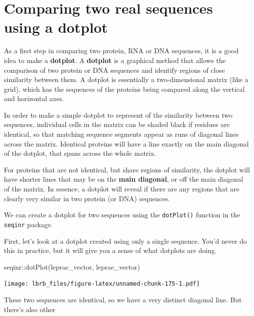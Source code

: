 \documentclass[
]{book}
\newenvironment{Shaded}{\begin{snugshade}}{\end{snugshade}}
\newcommand{\FunctionTok}[1]{\textcolor[rgb]{0.00,0.00,0.00}{#1}}
\newcommand{\NormalTok}[1]{#1}
\newcommand{\SpecialCharTok}[1]{\textcolor[rgb]{0.00,0.00,0.00}{#1}}
\begin{document}
\hypertarget{comparing-two-real-sequences-using-a-dotplot}{%
\section{Comparing two real sequences using a dotplot}\label{comparing-two-real-sequences-using-a-dotplot}}

As a first step in comparing two protein, RNA or DNA sequences, it is a good idea to make a \textbf{dotplot}. A \textbf{dotplot} is a graphical method that allows the comparison of two protein or DNA sequences and identify regions of close similarity between them. A dotplot is essentially a two-dimensional matrix (like a grid), which has the sequences of the proteins being compared along the vertical and horizontal axes.

In order to make a simple dotplot to represent of the similarity between two sequences, individual cells in the matrix can be shaded black if residues are identical, so that matching sequence segments appear as runs of diagonal lines across the matrix. Identical proteins will have a line exactly on the main diagonal of the dotplot, that spans across the whole matrix.

For proteins that are not identical, but share regions of similarity, the dotplot will have shorter lines that may be on the \textbf{main diagonal}, or off the main diagonal of the matrix. In essence, a dotplot will reveal if there are any regions that are clearly very similar in two protein (or DNA) sequences.

We can create a dotplot for two sequences using the \texttt{dotPlot()} function in the \texttt{seqinr} package.

First, let's look at a dotplot created using only a single sequence. You'd never do this in practice, but it will give you a sense of what dotplots are doing.

\begin{Shaded}
\begin{Highlighting}[]
\NormalTok{seqinr}\SpecialCharTok{::}\FunctionTok{dotPlot}\NormalTok{(leprae\_vector, }
\NormalTok{                leprae\_vector)}
\end{Highlighting}
\end{Shaded}

\texttt{[image: lbrb\_files/figure-latex/unnamed-chunk-175-1.pdf]}

These two sequences are identical, so we have a very distinct diagonal line. But there's also other
\end{document}
